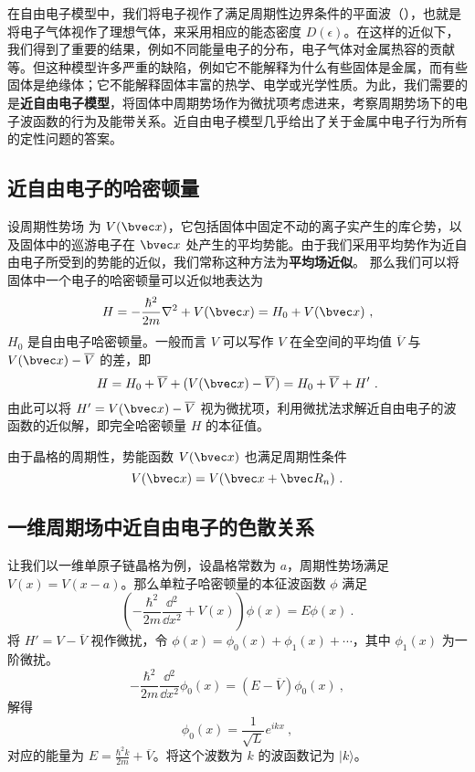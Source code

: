 

在自由电子模型中，我们将电子视作了满足周期性边界条件的平面波（），也就是将电子气体视作了理想气体，来采用相应的能态密度 $D(\epsilon)$。在这样的近似下，我们得到了重要的结果，例如不同能量电子的分布，电子气体对金属热容的贡献等。但这种模型许多严重的缺陷，例如它不能解释为什么有些固体是金属，而有些固体是绝缘体；它不能解释固体丰富的热学、电学或光学性质。为此，我们需要的是\textbf{近自由电子模型}，将固体中周期势场作为微扰项考虑进来，考察周期势场下的电子波函数的行为及能带关系。近自由电子模型几乎给出了关于金属中电子行为所有的定性问题的答案。

\subsection{近自由电子的哈密顿量}
设周期性势场 为 $V(\bvec x)$，它包括固体中固定不动的离子实产生的库仑势，以及固体中的巡游电子在 $\bvec x$ 处产生的平均势能。由于我们采用平均势作为近自由电子所受到的势能的近似，我们常称这种方法为\textbf{平均场近似}。
那么我们可以将固体中一个电子的哈密顿量可以近似地表达为
\begin{equation}
H=-\frac{\hbar^2}{2m}\nabla^2+V(\bvec x)=H_0+V(\bvec x)~,
\end{equation}
$H_0$ 是自由电子哈密顿量。一般而言 $V$ 可以写作 $V$ 在全空间的平均值 $\overline V$ 与 $V(\bvec x)-\overline V$ 的差，即
\begin{equation}
H=H_0+\overline V+(V(\bvec x)-\overline V)=H_0+\overline V+H'~.
\end{equation}
由此可以将 $H'=V(\bvec x)-\overline V$ 视为微扰项，利用微扰法求解近自由电子的波函数的近似解，即完全哈密顿量 $H$ 的本征值。

由于晶格的周期性，势能函数 $V(\bvec x)$ 也满足周期性条件
\begin{equation}
V(\bvec x)=V(\bvec x+\bvec R_n)~.
\end{equation}
\subsection{一维周期场中近自由电子的色散关系}
让我们以一维单原子链晶格为例，设晶格常数为 $a$，周期性势场满足 $V(x)=V(x-a)$。那么单粒子哈密顿量的本征波函数 $\phi$ 满足
\begin{equation}\label{eq_egasmd_1}
\left(-\frac{\hbar^2}{2m}\frac{\dd{}^2}{\dd x^2}+V(x)\right)\phi(x)=E\phi(x)~.
\end{equation}
将 $H'=V-\overline V$ 视作微扰，令 $\phi(x)=\phi_0(x)+\phi_1(x)+\cdots$，其中 $\phi_1(x)$ 为一阶微扰。
\begin{equation}
-\frac{\hbar^2}{2m}\frac{\dd{}^2}{\dd x^2} \phi_0(x)=(E-\overline V)\phi_0(x)~,
\end{equation}
解得
\begin{equation}
\phi_0(x)=\frac{1}{\sqrt{L}}e^{ikx}~,
\end{equation}
对应的能量为 $E=\frac{\hbar^2 k}{2m}+\overline V$。将这个波数为 $k$ 的波函数记为 $|k\rangle$。

